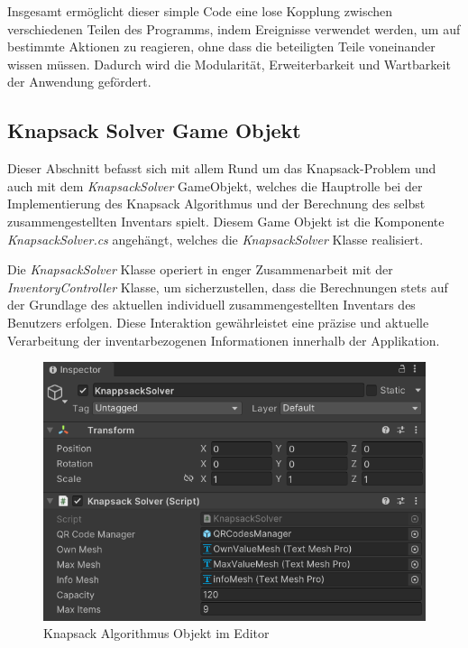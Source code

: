 Insgesamt ermöglicht dieser simple Code eine lose Kopplung zwischen verschiedenen Teilen des Programms, indem Ereignisse verwendet
werden, um auf bestimmte Aktionen zu reagieren, ohne dass die beteiligten Teile voneinander wissen müssen. Dadurch wird die
Modularität, Erweiterbarkeit und Wartbarkeit der Anwendung gefördert.

\subsection{Knapsack Solver Game Objekt} 
Dieser Abschnitt befasst sich mit allem Rund um das Knapsack-Problem und auch mit dem  \textit{KnapsackSolver} GameObjekt,
welches die Hauptrolle bei der Implementierung des Knapsack Algorithmus und der Berechnung des selbst zusammengestellten
Inventars spielt. Diesem Game Objekt ist die Komponente \textit{KnapsackSolver.cs} angehängt, welches die \textit{KnapsackSolver}
Klasse realisiert.

Die \textit{KnapsackSolver} Klasse operiert in enger Zusammenarbeit mit der \textit{InventoryController} Klasse, um
sicherzustellen, dass die Berechnungen stets auf der Grundlage des aktuellen individuell zusammengestellten Inventars des
Benutzers erfolgen. Diese Interaktion gewährleistet eine präzise und aktuelle Verarbeitung der inventarbezogenen Informationen
innerhalb der Applikation.\\

\begin{figure}[H]
\centering
\includegraphics[scale=0.8]{images/knapsackEditor}
\caption{Knapsack Algorithmus Objekt im Editor}
\label{fig:Knapsack_Editor}
\end{figure}

